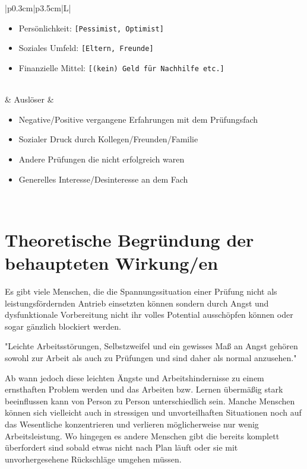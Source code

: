 \documentclass[11pt, a4paper]{article}
\begin{document}
\begin{table}[h!]
\begin{tabularx}{\textwidth}{|p{0.3cm}|p{3.5cm}|L|}
		\begin{itemize}[noitemsep, topsep=0pt]
			\item Persönlichkeit: \texttt{[Pessimist, Optimist]}
			\item Soziales Umfeld: \texttt{[Eltern, Freunde]}
			\item Finanzielle Mittel: \texttt{[(kein) Geld für Nachhilfe etc.]}
		\end{itemize} \\
		 & Auslöser                               & 
		\begin{itemize}[noitemsep, topsep=0pt]
			\item Negative/Positive vergangene Erfahrungen mit dem Prüfungsfach
			\item Sozialer Druck durch Kollegen/Freunden/Familie
			\item Andere Prüfungen die nicht erfolgreich waren
			\item Generelles Interesse/Desinteresse an dem Fach
		\end{itemize} \\
		\hline
	\end{tabularx}
\end{table}
\newpage

\section*{Theoretische Begründung der behaupteten Wirkung/en}
Es gibt viele Menschen, die die Spannungssituation einer Prüfung nicht als leistungsfördernden Antrieb einsetzten können sondern durch Angst und dysfunktionale Vorbereitung nicht ihr volles Potential ausschöpfen können oder sogar gänzlich blockiert werden. \cite{Holm-Hadulla2009}

"Leichte Arbeitsstörungen, Selbstzweifel und ein gewisses Maß an Angst gehören sowohl zur Arbeit als auch zu Prüfungen und sind daher als normal anzusehen." \cite{Holm-Hadulla2009}

Ab wann jedoch diese leichten Ängste und Arbeitshindernisse zu einem ernsthaften Problem werden und das Arbeiten bzw. Lernen übermäßig stark beeinflussen kann von Person zu Person unterschiedlich sein. Manche Menschen können sich vielleicht auch in stressigen und unvorteilhaften Situationen noch auf das Wesentliche konzentrieren und verlieren möglicherweise nur wenig Arbeitsleistung. Wo hingegen es andere Menschen gibt die bereits komplett überfordert sind sobald etwas nicht nach Plan läuft oder sie mit unvorhergesehene Rückschläge umgehen müssen.
\end{document}
